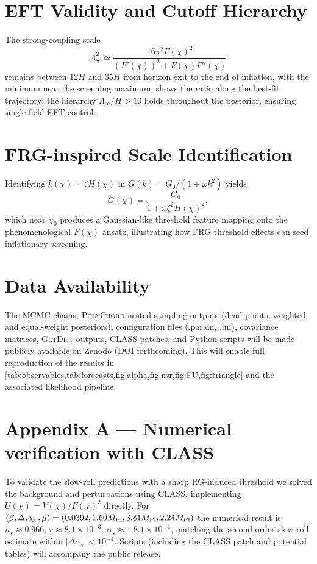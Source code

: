 \documentclass[11pt,a4paper]{article}
\begin{document}
\section{EFT Validity and Cutoff Hierarchy}
\label{sec:eft}
The strong-coupling scale
\begin{equation}
\Lambda_{\text{sc}}^{2}\simeq \frac{16\pi^{2}F(\chi)^{2}}{\left(F'(\chi)\right)^{2}+F(\chi)F''(\chi)}
\end{equation}
remains between $12H$ and $35H$ from horizon exit to the end of inflation, with the minimum near the screening maximum.  shows the ratio along the best-fit trajectory; the hierarchy $\Lambda_{\text{sc}}/H>10$ holds throughout the posterior, ensuring single-field EFT control.

\section{FRG-inspired Scale Identification}
\label{sec:frg}
Identifying $k(\chi)=\zeta H(\chi)$ in $G(k)=G_{0}/(1+\omega k^{2})$ yields
\begin{equation}
G(\chi)=\frac{G_{0}}{1+\omega\zeta^{2}H(\chi)^{2}},
\end{equation}
which near $\chi_{0}$ produces a Gaussian-like threshold feature mapping onto the phenomenological $F(\chi)$ ansatz, illustrating how FRG threshold effects can seed inflationary screening.

\section{Data Availability}
\label{sec:data}
The MCMC chains, \textsc{PolyChord} nested-sampling outputs (dead points, weighted and equal-weight posteriors), configuration files (.param, .ini), covariance matrices, \textsc{GetDist} outputs, \textsc{CLASS} patches, and Python scripts will be made publicly available on Zenodo (DOI forthcoming). This will enable full reproduction of the results in \cref{tab:observables,tab:forecasts,fig:alpha,fig:nsr,fig:FU,fig:triangle} and the associated likelihood pipeline.

\appendix

\section{Appendix A --- Numerical verification with CLASS}
To validate the slow-roll predictions with a sharp RG-induced threshold we solved the background and perturbations using \textsc{CLASS}, implementing $U(\chi)=V(\chi)/F(\chi)^{2}$ directly. For $(\beta,\Delta,\chi_{0},\mu)=(0.0392,1.60M_{\rm Pl},3.81M_{\rm Pl},2.24M_{\rm Pl})$ the numerical result is $n_{s}\approx0.966$, $r\approx8.1\times10^{-3}$, $\alpha_{s}\approx-8.1\times10^{-4}$, matching the second-order slow-roll estimate within $|\Delta\alpha_{s}|<10^{-4}$. Scripts (including the \textsc{CLASS} patch and potential tables) will accompany the public release.
\end{document}
